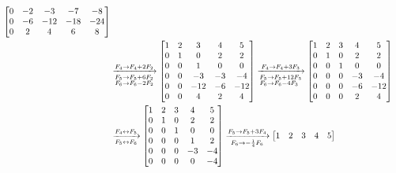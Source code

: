 \begin{enumerate}[label=\color{red}\textbf{\arabic*)}]
\begin{enumerate}[label=Paso \arabic*:]
\[\begin{aligned}
\begin{bmatrix}
            0 & -2 & -3 & -7 & -8\\
            0 & -6 & -12 & -18 & -24\\
            0 & 2 & 4 & 6 & 8
        \end{bmatrix}\\
& \xrightarrow[\begin{subarray}{l}
            F_5\to F_5+6F_2\\
            F_6\to F_6-2F_2
        \end{subarray}]{F_4\to F_4+2F_2}\begin{bmatrix} 
            1 & 2 & 3 & 4 & 5\\
            0 & 1 & 0 & 2 & 2\\
            0 & 0 & 1 & 0 & 0\\
            0 & 0 & -3 & -3 & -4\\
            0 & 0 & -12 & -6 & -12\\
            0 & 0 & 4 & 2 & 4
        \end{bmatrix} \xrightarrow[\begin{subarray}{l}
            F_5\to F_5+12F_3\\
            F_6\to F_6-4F_3
        \end{subarray}]{F_4\to F_4+3F_3}\begin{bmatrix} 
            1 & 2 & 3 & 4 & 5\\
            0 & 1 & 0 & 2 & 2\\
            0 & 0 & 1 & 0 & 0\\
            0 & 0 & 0 & -3 & -4\\
            0 & 0 & 0 & -6 & -12\\
            0 & 0 & 0 & 2 & 4
        \end{bmatrix}\\
& \xrightarrow[F_5\leftrightarrow F_6]{F_4\leftrightarrow F_5}\begin{bmatrix} 
            1 & 2 & 3 & 4 & 5\\
            0 & 1 & 0 & 2 & 2\\
            0 & 0 & 1 & 0 & 0\\
            0 & 0 & 0 & 1 & 2\\
            0 & 0 & 0 & -3 & -4\\
            0 & 0 & 0 & 0 & -4
        \end{bmatrix} \xrightarrow[F_6\to -\frac{1}{4} F_6]{F_5\to F_5+3F_4} \begin{bmatrix} 
            1 & 2 & 3 & 4 & 5\\

\end{bmatrix}
\end{aligned}\]
\end{enumerate}
\end{enumerate}
